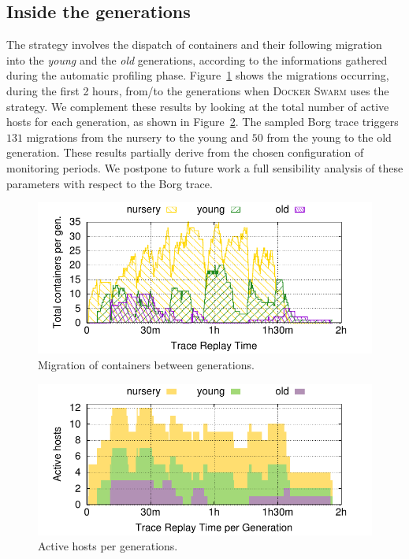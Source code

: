 \subsection{Inside the \GP generations}
\label{subsec:eval:inside}

The \GP strategy involves the dispatch of containers and their following migration into the \emph{young} and the \emph{old} generations, according to the informations gathered during the automatic profiling phase.
Figure~\ref{fig:inside} shows the migrations occurring, during the first 2 hours, from/to the generations when \textsc{Docker Swarm} uses the \GP strategy.
We complement these results by looking at the total number of active hosts for each generation, as shown in Figure~\ref{fig:inside:generation}.
The sampled Borg trace triggers $131$ migrations from the nursery to the young and $50$ from the young to the old generation.
These results partially derive from the chosen configuration of monitoring periods.
We postpone to future work a full sensibility analysis of these parameters with respect to the Borg trace.

\begin{figure}[t!]
  \centering
  \includegraphics[]{figures/plots/containers/containers}
  \caption{Migration of containers between generations.}
  \label{fig:inside}
\end{figure}

\begin{figure}[t!]
  \centering
  \includegraphics[]{figures/plots/containers/generation_hosts}
  \caption{Active hosts per generations.}
  \label{fig:inside:generation}
\end{figure}

